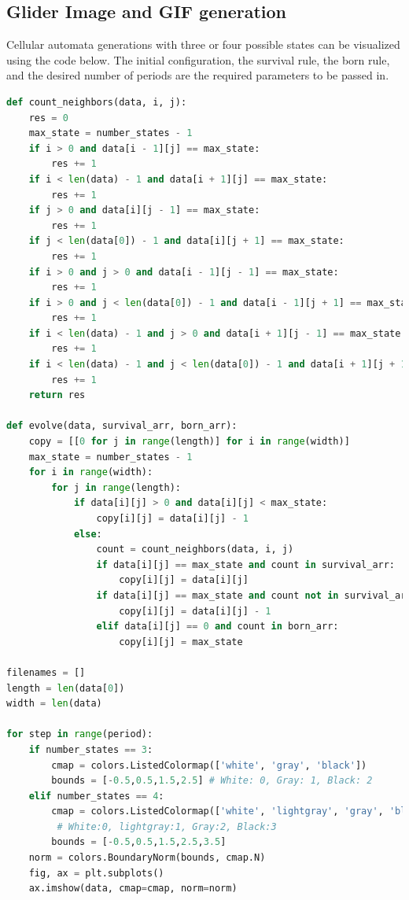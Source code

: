 \documentclass[12pt]{article}
\numberwithin{figure}{section} %
\begin{document}
\subsection{Glider Image and GIF generation}
\label{subsection:Glider Image and GIF generation}
Cellular automata generations with three or four possible states can be visualized using the code below. The initial configuration, the survival rule, the born rule, and the desired number of periods are the required parameters to be passed in. 
\begin{lstlisting}[language = Python]
def count_neighbors(data, i, j):
    res = 0
    max_state = number_states - 1
    if i > 0 and data[i - 1][j] == max_state:
        res += 1
    if i < len(data) - 1 and data[i + 1][j] == max_state:
        res += 1
    if j > 0 and data[i][j - 1] == max_state:
        res += 1
    if j < len(data[0]) - 1 and data[i][j + 1] == max_state:
        res += 1
    if i > 0 and j > 0 and data[i - 1][j - 1] == max_state: 
        res += 1
    if i > 0 and j < len(data[0]) - 1 and data[i - 1][j + 1] == max_state:
        res += 1
    if i < len(data) - 1 and j > 0 and data[i + 1][j - 1] == max_state:
        res += 1
    if i < len(data) - 1 and j < len(data[0]) - 1 and data[i + 1][j + 1] == max_state:
        res += 1
    return res

def evolve(data, survival_arr, born_arr): 
    copy = [[0 for j in range(length)] for i in range(width)]
    max_state = number_states - 1
    for i in range(width):
        for j in range(length):
            if data[i][j] > 0 and data[i][j] < max_state: 
                copy[i][j] = data[i][j] - 1
            else: 
                count = count_neighbors(data, i, j)
                if data[i][j] == max_state and count in survival_arr: 
                    copy[i][j] = data[i][j]
                if data[i][j] == max_state and count not in survival_arr: 
                    copy[i][j] = data[i][j] - 1
                elif data[i][j] == 0 and count in born_arr:
                    copy[i][j] = max_state

filenames = []
length = len(data[0])
width = len(data)

for step in range(period): 
    if number_states == 3: 
        cmap = colors.ListedColormap(['white', 'gray', 'black'])
        bounds = [-0.5,0.5,1.5,2.5] # White: 0, Gray: 1, Black: 2
    elif number_states == 4: 
        cmap = colors.ListedColormap(['white', 'lightgray', 'gray', 'black'])
	     # White:0, lightgray:1, Gray:2, Black:3
        bounds = [-0.5,0.5,1.5,2.5,3.5] 
    norm = colors.BoundaryNorm(bounds, cmap.N)
    fig, ax = plt.subplots()
    ax.imshow(data, cmap=cmap, norm=norm)


\end{lstlisting}
\end{document}
